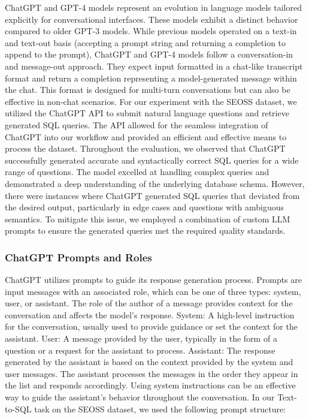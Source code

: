 ChatGPT and GPT-4 models represent an evolution in language models tailored explicitly for conversational interfaces. These models exhibit a distinct behavior compared to older GPT-3 models. While previous models operated on a text-in and text-out basis (accepting a prompt string and returning a completion to append to the prompt), ChatGPT and GPT-4 models follow a conversation-in and message-out approach. They expect input formatted in a chat-like transcript format and return a completion representing a model-generated message within the chat. This format is designed for multi-turn conversations but can also be effective in non-chat scenarios.
For our experiment with the SEOSS dataset, we utilized the ChatGPT API to submit natural language questions and retrieve generated SQL queries. The API allowed for the seamless integration of ChatGPT into our workflow and provided an efficient and effective means to process the dataset.
Throughout the evaluation, we observed that ChatGPT successfully generated accurate and syntactically correct SQL queries for a wide range of questions. The model excelled at handling complex queries and demonstrated a deep understanding of the underlying database schema.
However, there were instances where ChatGPT generated SQL queries that deviated from the desired output, particularly in edge cases and questions with ambiguous semantics. To mitigate this issue, we employed a combination of custom LLM prompts to ensure the generated queries met the required quality standards.

\subsubsection{ChatGPT Prompts and Roles}

ChatGPT utilizes prompts to guide its response generation process. Prompts are input messages with an associated role, which can be one of three types: system, user, or assistant. The role of the author of a message provides context for the conversation and affects the model's response.
System: A high-level instruction for the conversation, usually used to provide guidance or set the context for the assistant.
User: A message provided by the user, typically in the form of a question or a request for the assistant to process.
Assistant: The response generated by the assistant is based on the context provided by the system and user messages.
The assistant processes the messages in the order they appear in the list and responds accordingly. Using system instructions can be an effective way to guide the assistant's behavior throughout the conversation.
In our Text-to-SQL task on the SEOSS dataset, we used the following prompt structure:

